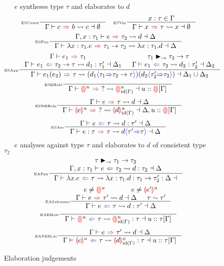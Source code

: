 \begin{figure}[h]
\small
{}\ \ \ $e$ syntheses type $\tau$ and elaborates to $d$
\tiny 
\[\inference[\tiny ESConst]{}{\elaborationSynthesis{c}{b}{c}{\emptyset}} \quad 
\inference[\tiny ESVar]{x : \tau \in \Gamma}{\elaborationSynthesis{x}{\tau}{x}{\emptyset}}\]
\[\inference[\tiny ESFun]{\elaborationSynthesis[\Gamma,x:\tau_1]{e}{\tau_2}{d}{\Delta}}{\elaborationSynthesis{\lambda x:\tau_1.e}{\tau_1 \to \tau_2}{\lambda x:\tau_1. d}{\Delta}}\]
\[\inference[\tiny ESApp]{\synthesis{e_1}{\tau_1} & \tau_1 \funmatch \tau_2 \to \tau \\ \elaborationAnalysis{e_1}{\tau_2 \to \tau}{d_1}{\tau_1'}{\Delta_1} & \elaborationAnalysis{e_1}{\tau_2}{d_2}{\tau_2'}{\Delta_2}}{\elaborationSynthesis{e_1(e_2)}{\tau}{(d_1\scast{\tau_1}{\tau_2 \to \tau})(d_2\scast{\tau_2'}{\tau_2})}{\Delta_1 \cup \Delta_2}}\]
\[\inference[\tiny ESEHole]{}{\elaborationSynthesis{\hole^u}{?}{\hole^u_{\mathrm{id}(\Gamma)}}{u :: \hole[] [\Gamma]}}\]
\[\inference[\tiny ESNEHole]{\elaborationSynthesis{e}{\tau}{d}{\Delta}}{\elaborationSynthesis{\hole[e]^u}{?}{\hole[d]^u_{\mathrm{id}(\Gamma)}}{\Delta, u :: \hole[] [\Gamma]}}\]
\[\inference[\tiny ESAsc]{\elaborationAnalysis{e}{\tau}{d}{\tau'}{\Delta}}{\elaborationSynthesis{e:\tau}{\tau}{d\scast{\tau'}{\tau}}{\Delta}}\]
\small
{}\ \ \ $e$ analyses against type $\tau$ and elaborates to $d$ of consistent type $\tau_2$
\tiny 
\[\inference[\tiny EAFun]{\tau \funmatch \tau_1 \to \tau_2 \\ \elaborationAnalysis[\Gamma,x:\tau_1]{e}{\tau_2}{d}{\tau_2}{\Delta}}{\elaborationAnalysis{\lambda x. e}{\tau}{\lambda x:\tau_1. d : \tau_1 \to \tau_2'}{\Delta}}\]
\[\inference[\tiny EASubsume]{e \neq \hole^u & e \neq \hole[e']^u \\ \elaborationSynthesis{e}{\tau'}{d}{\Delta} & \tau \sim \tau'}{\elaborationAnalysis{e}{\tau}{d}{\tau'}{\Delta}}\]
\[\inference[\tiny EAEHole]{}{\elaborationAnalysis{\hole^u}{\tau}{\hole^u_{\mathrm{id}(\Gamma)}}{\tau}{u::\tau[\Gamma]}}\]
\[\inference[\tiny EANEHole]{\elaborationSynthesis{e}{\tau'}{d}{\Delta}}{\elaborationAnalysis{\hole[e]^u}{\tau}{\hole[d]^u_{\mathrm{id}(\Gamma)}}{\tau}{u::\tau[\Gamma]}}\]

\caption{Elaboration judgements} 
\label{fig:elaboration}
\end{figure}


